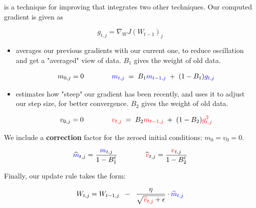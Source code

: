             \begin{definition}
                 is a technique for improving  that integrates two other techniques. Our computed gradient is given as 

                \begin{equation*}
                    g_{t,j} = \nabla_{W}J(W_{t-1})_j
                \end{equation*}

                \begin{itemize}
                    \item {} averages our previous gradients with our current one, to reduce oscillation and get a "averaged" view of data. $B_1$ gives the weight of old data.

                        \begin{equation*}
                            \begin{gathered}
                                m_{0,j} = 0 \qquad \qquad
                            \textcolor{blue}{m_{t,j}} \;=\; B_1 \textcolor{blue}{m_{t-1,j}} \;+\; (1-B_1) \textcolor{blue}{ g_{t,j} }
                            \end{gathered}
                        \end{equation*}

                    \item {} estimates how "steep" our gradient has been recently, and uses it to adjust our step size, for better convergence. $B_2$ gives the weight of old data.

                            \begin{equation*}
                                \begin{gathered}
                                    v_{0,j} = 0 \qquad \qquad
                                    \textcolor{red}{v_{t,j}} \;=\; B_2 \textcolor{red}{m_{t-1,j}} \;+\; (1-B_2) \textcolor{red}{ g_{t,j}^2 }
                                \end{gathered}
                            \end{equation*}
                        \end{itemize}

                We include a \textbf{correction} factor for the zeroed initial conditions: $m_0=v_0=0$.

                \begin{equation*}
                    \widehat{\textcolor{blue}{m}}_{t,j} = \frac{\textcolor{blue}{m}_{t,j}}{1-B_1^t}
                    \qquad \qquad 
                    \widehat{\textcolor{red}{v}}_{t,j} = \frac{\textcolor{red}{v}_{t,j}}{1-B_2^t}
                \end{equation*}

                Finally, our update rule takes the form:

                \begin{equation*}
                    W_{t,j} = W_{t-1,j}  
                        \;\;-\;\; 
                    \frac{\eta}{ \sqrt{\textcolor{red}{\widehat{v}_{t,j}}+\epsilon} } \cdot \textcolor{blue}{\widehat{m}_{t,j}}
                \end{equation*}
            \end{definition}

